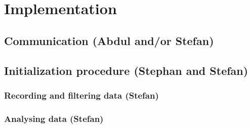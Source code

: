 \section{Implementation}\label{Sec_Imp}

\subsection{Communication (Abdul and/or Stefan)}

\subsection{Initialization procedure (Stephan and Stefan)}\label{Sec_Imp_Ini}

\subsubsection{Recording and filtering data (Stefan)}

\subsubsection{Analysing data (Stefan)}

